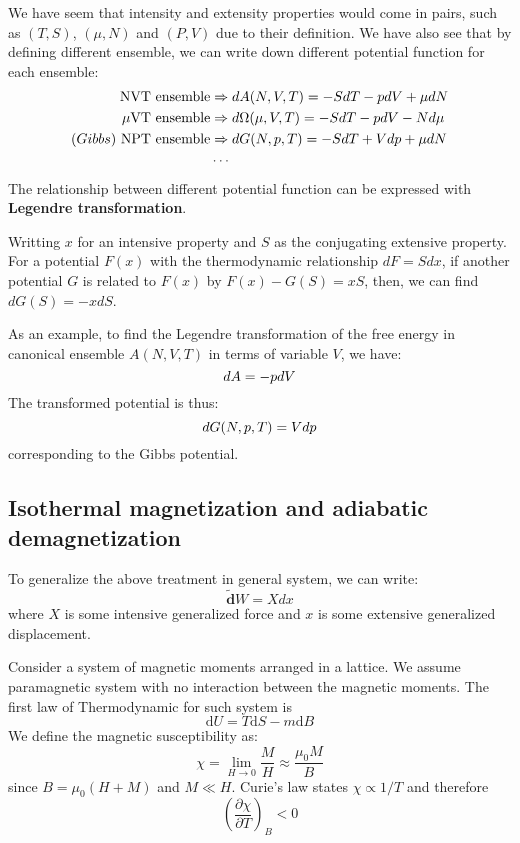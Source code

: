 \documentclass{article}
\newcommand{\pfrac}[2]{\frac{\partial #1}{\partial #2}}
\newcommand{\dbar}{\mathbf{\tilde{d}}}
\newcommand{\dnor}{\text{d}}
\begin{document}
We have seem that intensity and extensity properties would come in pairs, such as $(T,S)$, $(\mu,N)$
and $(P,V)$ due to their definition. We have also see that by defining different ensemble, we can
write down different potential function for each ensemble:
\begin{align}
    \text{NVT ensemble} &\Rightarrow dA(N,V,T) = -SdT - pdV + \mu dN\notag \\
    \text{$\mu$VT ensemble} &\Rightarrow d\Omega(\mu,V,T) = -SdT - pdV - Nd\mu \notag \\
    (Gibbs)\ \text{NPT ensemble} &\Rightarrow dG(N,p,T) = -SdT + Vdp + \mu dN \notag \\
    &\cdots \notag
\end{align}
The relationship between different potential function can be expressed with \textbf{Legendre transformation}.

Writting $x$ for an intensive property and $S$ as the conjugating extensive property. For a potential $F(x)$
with the thermodynamic relationship $dF = Sdx$, if another potential $G$ is related to $F(x)$ by $F(x) - G(S) = xS$,
then, we can find $dG(S) = -xdS$.

As an example, to find the Legendre transformation of the free energy in canonical ensemble $A(N,V,T)$ in terms of 
variable $V$, we have:
\begin{equation}
    dA = -pdV \notag
\end{equation} 
The transformed potential is thus:
\begin{equation}
    dG(N,p,T) = Vdp \notag
\end{equation} 
corresponding to the 
Gibbs potential. 

\subsection{Isothermal magnetization and adiabatic demagnetization}
To generalize the above treatment in general system, we can write:
\begin{equation}
    \dbar W = X dx
\end{equation}
where $X$ is some intensive generalized force and $x$ is some 
extensive generalized displacement.

Consider a system of magnetic moments arranged in a lattice. We 
assume paramagnetic system with no interaction between the magnetic moments. 
The first law of Thermodynamic for such system is 
\begin{equation}
    \dnor U = T \dnor S - m \dnor B
\end{equation}
We define the magnetic susceptibility as:
\begin{equation}
    \chi = \lim_{H\to0} \frac{M}{H} \approx \frac{\mu_0 M}{B}
\end{equation}
since $B = \mu_0(H+M)$ and $M \ll H$.
Curie's law states $\chi \propto 1/T$ and therefore
\begin{equation}
    \left(\pfrac{\chi}{T}\right)_B < 0
\end{equation}
\end{document}
